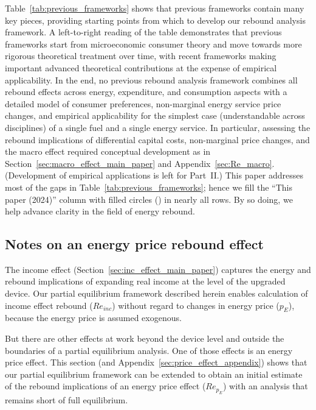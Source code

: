 \documentclass[12pt]{article}\usepackage[]{graphicx}\usepackage[]{xcolor}
\begin{document}
Table~\ref{tab:previous_frameworks} shows that 
previous frameworks contain many key pieces, 
providing starting points from which to develop 
our rebound analysis framework.
A left-to-right reading of the table 
demonstrates that previous frameworks start from microeconomic
consumer theory and move towards more rigorous theoretical treatment over time,
with recent frameworks making important advanced theoretical contributions
at the expense of empirical applicability.
In the end, no previous rebound analysis framework 
combines all rebound effects
across energy, expenditure, and consumption aspects with 
a detailed model of consumer preferences, 
non-marginal energy service price changes, and
empirical applicability 
for the simplest case (understandable across disciplines)
of a single fuel and a single energy service.
In particular, 
assessing the rebound implications of differential capital costs,
non-marginal price changes, and the macro effect
required conceptual development
as in Section~\ref{sec:macro_effect_main_paper} and Appendix~\ref{sec:Re_macro}.
(Development of empirical applications is left for Part~II.)
This paper addresses most of the gaps in Table~\ref{tab:previous_frameworks};
hence we fill the ``This paper (2024)'' column 
with filled circles ()
in nearly all rows.
By so doing, we help advance clarity in the field of energy rebound.


\subsection{Notes on an energy price rebound effect}
\label{sec:notes_price_effect}

The income effect (Section~\ref{sec:inc_effect_main_paper})
captures the energy and rebound implications
of expanding real income at the level of the upgraded device.
Our partial equilibrium framework described herein
enables calculation of income effect rebound ($Re_{inc}$)
without regard to changes in energy price ($p_E$), 
because the energy price is assumed exogenous.

But there are other effects at work
beyond the device level and outside the boundaries of a
partial equilibrium analysis.
One of those effects is an energy price effect.
This section (and Appendix~\ref{sec:price_effect_appendix})
shows that our partial equilibrium framework can be extended to 
obtain an initial estimate of the 
rebound implications
of an energy price effect
($Re_{p_E}$)
with an analysis 
that remains short of full equilibrium.
\end{document}
